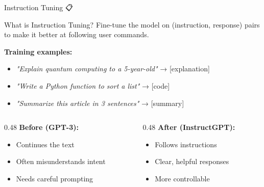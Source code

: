\documentclass[aspectratio=169]{beamer}
\begin{document}
\begin{frame}[shrink=10]{Instruction Tuning 📋}
\small
    \begin{block}{What is Instruction Tuning?}
        Fine-tune the model on (instruction, response) pairs to make it better at following user commands.
    \end{block}

    \vspace{0.3cm}

    \textbf{Training examples:}
    \begin{itemize}\setlength{\itemsep}{0pt}
        \item \textit{"Explain quantum computing to a 5-year-old"} → [explanation]
        \item \textit{"Write a Python function to sort a list"} → [code]
        \item \textit{"Summarize this article in 3 sentences"} → [summary]
    \end{itemize}

    \vspace{0.3cm}

    \begin{columns}[T]
        \begin{column}{0.48\textwidth}
            \textbf{Before (GPT-3):}
            \begin{itemize}\setlength{\itemsep}{0pt}
                \item Continues the text
                \item Often misunderstands intent
                \item Needs careful prompting
            \end{itemize}
        \end{column}

        \begin{column}{0.48\textwidth}
            \textbf{After (InstructGPT):}
            \begin{itemize}\setlength{\itemsep}{0pt}
                \item Follows instructions
                \item Clear, helpful responses
                \item More controllable
            \end{itemize}
        \end{column}
    \end{columns}
\end{frame}
\end{document}
